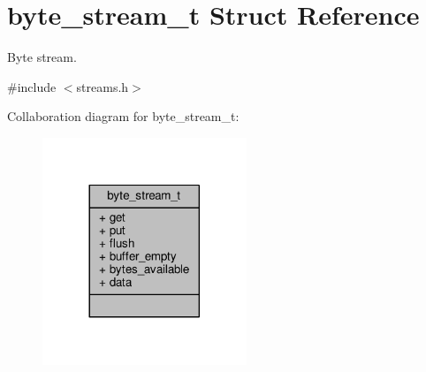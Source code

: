 \hypertarget{structbyte__stream__t}{\section{byte\+\_\+stream\+\_\+t Struct Reference}
\label{structbyte__stream__t}
}


Byte stream.  




{\ttfamily \#include $<$streams.\+h$>$}



Collaboration diagram for byte\+\_\+stream\+\_\+t\+:
\nopagebreak
\begin{figure}[H]
\begin{center}
\leavevmode
\includegraphics[width=173pt]{structbyte__stream__t__coll__graph}
\end{center}
\end{figure}

